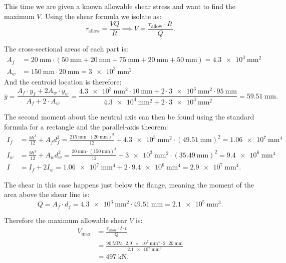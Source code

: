 \begin{derivation}
  This time we are given a known allowable shear stress and want to find the maximum $V$.
  Using the shear formula we isolate as:
  \begin{equation*}
    \tau_{\mathrm{allow}} = \frac{VQ}{It} \implies V = \frac{\tau_{\mathrm{allow}} \cdot It}{Q}
  .\end{equation*}

  The cross-sectional areas of each part is:
  \begin{align*}
    A_f &= \qty{20}{\mm} \cdot \left( \qty{50}{\mm} + \qty{20}{\mm} + \qty{75}{\mm} + \qty{20}{\mm} + \qty{50}{\mm}  \right)  = \qty{4,3e3}{\mm^2}\\
    A_w &= \qty{150}{\mm} \cdot \qty{20}{\mm}   = \qty{3e3}{\mm^2}
  .\end{align*}
  And the centroid location is therefore:
  \begin{equation*}
    \overline{y} = \frac{A_f \cdot y_f + 2 A_w \cdot y_w}{A_f + 2 \cdot A_w} = \frac{\qty{4,3e3}{\mm^2} \cdot \qty{10}{\mm} + 2 \cdot \qty{3e3}{\mm^2} \cdot \qty{95}{\mm} }{\qty{4,3e3}{\mm^2} + 2\cdot \qty{3e3}{\mm^2} } = \qty{59,51}{\mm} 
  .\end{equation*}

  The second moment about the neutral axis can then be found using the standard formula for a rectangle and the parallel-axis theorem:
  \begin{align*}
    I_f &= \frac{bh^3}{12} + A_f d_f^2 = \frac{\qty{215}{\mm} \cdot \left( \qty{20}{\mm}  \right)^3}{12} + \qty{4,3e3}{\mm^2} \cdot \left( \qty{49,51}{\mm}  \right)^2 = \qty{1,06e7}{\mm^{4}}  \\
    I_w &= \frac{bh^3}{12} + A_w d_w^2 = \frac{\qty{20}{\mm} \cdot \left( \qty{150}{\mm}  \right)^3}{12} + \qty{3e3}{\mm^2} \cdot \left( \qty{35,49}{\mm}  \right)^2 = \qty{9,4e6}{\mm^{4}} \\
    I &= I_f + 2I_w = \qty{1,06e7}{\mm^{4}}  + 2\cdot \qty{9,4e6}{\mm^{4}} = \qty{2,9e7}{\mm^{4}} 
  .\end{align*}
  
  The shear in this case happens just below the flange, meaning the moment of the area above the shear line is:
  \begin{equation*}
    Q = A_f \cdot d_f = \qty{4,3e3}{\mm^2} \cdot \qty{49,51}{\mm} = \qty{2,1e5}{\mm^3} 
  .\end{equation*}
  
  Therefore the maximum allowable shear $V$ is:
  \begin{align*}
    V_{\mathrm{max}} &= \frac{\tau_{\mathrm{allow}} \cdot I \cdot t}{Q} \\
    &= \frac{\qty{90}{\MPa} \cdot \qty{2,9e7}{\mm^{4}} \cdot 2\cdot \qty{20}{\mm} }{\qty{2,1e5}{\mm^3} } \\
    &= \qty{497}{\kN} 
  .\end{align*}
\end{derivation}


